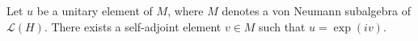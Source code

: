 Let $u$ be a unitary element of $M$, where $M$ denotes a von Neumann subalgebra of $\mathcal{L}(H)$. There exists a self-adjoint element $v \in M$ such that $u = \exp(iv)$.
